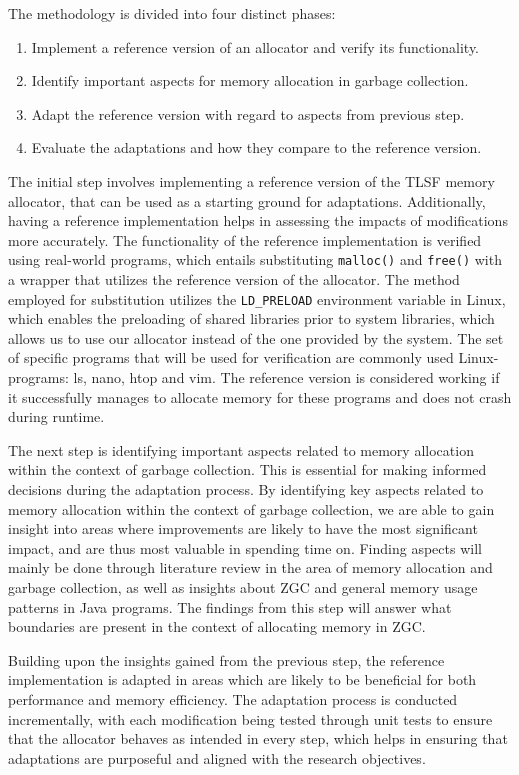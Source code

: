 
The methodology is divided into four distinct phases:

\begin{enumerate}
    \item Implement a reference version of an allocator and verify its functionality.
    \item Identify important aspects for memory allocation in garbage collection.
    \item Adapt the reference version with regard to aspects from previous step.
    \item Evaluate the adaptations and how they compare to the reference version.
\end{enumerate}

The initial step involves implementing a reference version of the TLSF memory allocator, that can be used as a starting ground for adaptations. Additionally, having a reference implementation helps in assessing the impacts of modifications more accurately. The functionality of the reference implementation is verified using real-world programs, which entails substituting \texttt{malloc()} and \texttt{free()} with a wrapper that utilizes the reference version of the allocator. The method employed for substitution utilizes the \texttt{LD\_PRELOAD} environment variable in Linux, which enables the preloading of shared libraries prior to system libraries, which allows us to use our allocator instead of the one provided by the system. The set of specific programs that will be used for verification are commonly used Linux-programs: ls, nano, htop and vim. The reference version is considered working if it successfully manages to allocate memory for these programs and does not crash during runtime. 

The next step is identifying important aspects related to memory allocation within the context of garbage collection. This is essential for making informed decisions during the adaptation process. By identifying key aspects related to memory allocation within the context of garbage collection, we are able to gain insight into areas where improvements are likely to have the most significant impact, and are thus most valuable in spending time on. Finding aspects will mainly be done through literature review in the area of memory allocation and garbage collection, as well as insights about ZGC and general memory usage patterns in Java programs. The findings from this step will answer what boundaries are present in the context of allocating memory in ZGC.

Building upon the insights gained from the previous step, the reference implementation is adapted in areas which are likely to be beneficial for both performance and memory efficiency. The adaptation process is conducted incrementally, with each modification being tested through unit tests to ensure that the allocator behaves as intended in every step, which helps in ensuring that adaptations are purposeful and aligned with the research objectives. 

